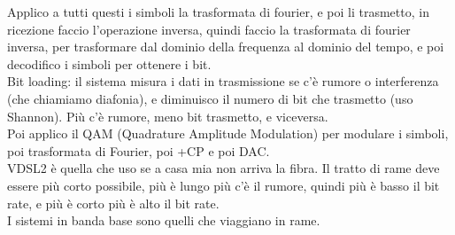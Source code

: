 Applico a tutti questi i simboli la trasformata di fourier, e poi li trasmetto, in ricezione faccio l'operazione inversa, 
quindi faccio la trasformata di fourier inversa, per trasformare dal dominio della frequenza al dominio del tempo, 
e poi decodifico i simboli per ottenere i bit.\\

Bit loading: il sistema misura i dati in trasmissione se c'è rumore o interferenza (che chiamiamo diafonia), 
e diminuisco il numero di bit che trasmetto (uso Shannon). Più c'è rumore, meno bit trasmetto, e viceversa.\\

Poi applico il QAM (Quadrature Amplitude Modulation) per modulare i simboli, poi trasformata di Fourier, poi +CP e poi DAC.\\

VDSL2 è quella che uso se a casa mia non arriva la fibra. Il tratto di rame deve essere più corto possibile, 
più è lungo più c'è il rumore, quindi più è basso il bit rate, e più è corto più è alto il bit rate.\\

I sistemi in banda base sono quelli che viaggiano in rame. 
